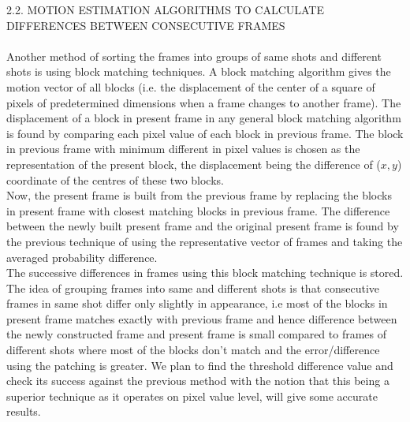 \documentclass[twocolumn,twoside]{article}
\begin{document}
		
\vspace{3cm}
		
{\normalsize 2.2. MOTION ESTIMATION ALGORITHMS TO CALCULATE DIFFERENCES BETWEEN CONSECUTIVE FRAMES}\\ \\

Another method of sorting the frames into groups of same shots and different shots is using block matching techniques. A block matching algorithm gives the motion vector of all blocks (i.e. the displacement of the center of a square of pixels of predetermined dimensions when a frame changes to another frame). The displacement of a block in present frame in any general block matching algorithm is found by comparing each pixel value of each block in previous frame. The block in previous frame with minimum different in pixel values is chosen as the representation of the present block, the displacement being the difference of ($x,y$) coordinate of the centres of these two blocks.\\

Now, the present frame is built from the previous frame by replacing the blocks in present frame with closest matching blocks in previous frame. The difference between the newly built present frame and the original present frame is found by the previous technique of using the representative vector of frames and taking the averaged probability difference.\\

The successive differences in frames using this block matching technique is stored. The idea of grouping frames into same and different shots is that consecutive frames in same shot differ only slightly in appearance, i.e most of the blocks in present frame matches exactly with previous frame and hence difference between the newly constructed frame and present frame is small compared to frames of different shots where most of the blocks don't match and the error/difference using the patching is greater. We plan to find the threshold difference value and check its success against the previous method with the notion that this being a superior technique as it operates on pixel value level, will give some accurate results.\\
\end{document}
